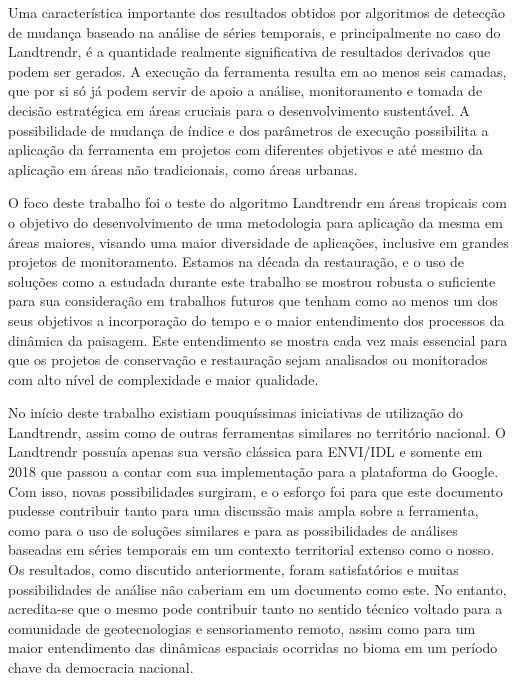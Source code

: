 Uma característica importante dos resultados obtidos por algoritmos de detecção de mudança baseado na análise de séries temporais, e principalmente no caso do Landtrendr, é a quantidade realmente significativa de resultados derivados que podem ser gerados. A execução da ferramenta resulta em ao menos seis camadas, que por si só já podem servir de apoio a análise, monitoramento e tomada de decisão estratégica em áreas cruciais para o desenvolvimento sustentável. A possibilidade de mudança de índice e dos parâmetros de execução possibilita a aplicação da ferramenta em projetos com diferentes objetivos e até mesmo da aplicação em áreas não tradicionais, como áreas urbanas.

O foco deste trabalho foi o teste do algoritmo Landtrendr em áreas tropicais com o objetivo do desenvolvimento de uma metodologia para aplicação da mesma em áreas maiores, visando uma maior diversidade de aplicações, inclusive em grandes projetos de monitoramento. Estamos na década da restauração, e o uso de soluções como a estudada durante este trabalho se mostrou robusta o suficiente para sua consideração em trabalhos futuros que tenham como ao menos um dos seus objetivos a incorporação do tempo e o maior entendimento dos processos da dinâmica da paisagem. Este entendimento se mostra cada vez mais essencial para que os projetos de conservação e restauração sejam analisados ou monitorados com alto nível de complexidade e maior qualidade. 

No início deste trabalho existiam pouquíssimas iniciativas de utilização do Landtrendr, assim como de outras ferramentas similares no território nacional. O Landtrendr possuía apenas sua versão clássica para ENVI/IDL e somente em 2018 que passou a contar com sua implementação para a plataforma do Google. Com isso, novas possibilidades surgiram, e o esforço foi para que este documento pudesse contribuir tanto para uma discussão mais ampla sobre a ferramenta, como para o uso de soluções similares e para as possibilidades de análises baseadas em séries temporais em um contexto territorial extenso como o nosso. Os resultados, como discutido anteriormente, foram satisfatórios e muitas possibilidades de análise não caberiam em um documento como este. No entanto, acredita-se que o mesmo pode contribuir tanto no sentido técnico voltado para a comunidade de geotecnologias e sensoriamento remoto, assim como para um maior entendimento das dinâmicas espaciais ocorridas no bioma em um período chave da democracia nacional.   